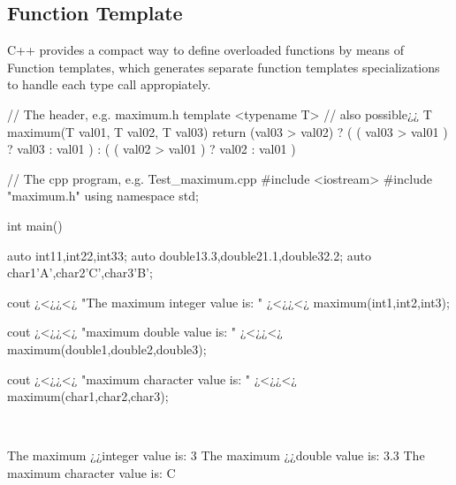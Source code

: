 \subsection{Function Template}
\label{subsec:Useufull-keyword-remarks-03-Function-Template}
C++ provides a compact way to define overloaded functions by means of Function templates, which generates separate function templates specializations to handle each type call appropiately.\\
\begin{minipage}{\MPWxLARGExLISTING\textwidth} %
{} %
\begin{CPPCode}
// The header, e.g. maximum.h
template <typename T>                       // also possible¿¿
T maximum(T val01, T val02, T val03)
{
    return (val03 > val02) 
                ? ( ( val03 > val01 ) ? val03 : val01 )
                : ( ( val02 > val01 ) ? val02 : val01 )
}
\end{CPPCode}
\begin{CPPCode}
// The cpp program, e.g. Test_maximum.cpp
#include <iostream>
#include "maximum.h"
using namespace std;

int main()
{
    auto int1{1},int2{2},int3{3};
    auto double1{3.3},double2{1.1},double3{2.2};
    auto char1{'A'},char2{'C'},char3{'B'};

    cout ¿<¿¿<¿ "The maximum integer value is: "
           ¿<¿¿<¿ maximum(int1,int2,int3);

    cout ¿<¿¿<¿ "\nThe maximum double value is: "
           ¿<¿¿<¿ maximum(double1,double2,double3);

    cout ¿<¿¿<¿ "\nThe maximum character value is: "
           ¿<¿¿<¿ maximum(char1,char2,char3);
}
\end{CPPCode}
\end{minipage}\\
\begin{minipage}{\MPWxLARGExLISTING\textwidth} %
{} %
\vspace{-0.3cm}
\begin{Terminal}
The maximum ¿\hspace{0.35cm}¿integer value is: 3
The maximum ¿\hspace{0.49cm}¿double value is: 3.3
The maximum character value is: C
\end{Terminal}
\end{minipage}


